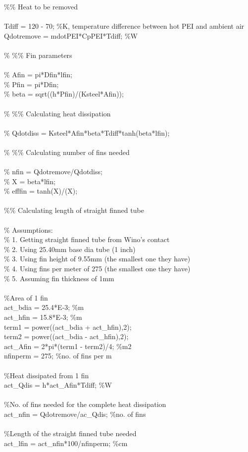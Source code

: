 \begin{appendices}
{\%\% Heat to be removed \\
\\
Tdiff = 120 - 70; \%K, temperature difference between hot PEI and ambient air \\
Qdotremove = mdotPEI*CpPEI*Tdiff; \%W \\
\\
\% \%\% Fin parameters \\
\\
\% Afin = pi*Dfin*lfin; \\
\% Pfin = pi*Dfin; \\
\% beta = sqrt((h*Pfin)/(Ksteel*Afin)); \\
\\
\% \%\% Calculating heat dissipation \\
\\
\% Qdotdiss = Ksteel*Afin*beta*Tdiff*tanh(beta*lfin); \\
\\ 
\% \%\% Calculating number of fins needed \\
\\
\% nfin = Qdotremove/Qdotdiss; \\
\% X = beta*lfin; \\
\% efffin = tanh(X)/(X); \\
\\
\%\% Calculating length of straight finned tube \\
\\
\% Assumptions: \\
\% 1. Getting straight finned tube from Wino's contact \\
\% 2. Using 25.40mm base dia tube (1 inch) \\
\% 3. Using fin height of 9.55mm (the smallest one they have) \\
\% 4. Using fins per meter of 275 (the smallest one they have) \\
\% 5. Assuming fin thickness of 1mm \\
\\ 
\%Area of 1 fin \\
act\_bdia = 25.4*E-3; \%m \\
act\_hfin = 15.8*E-3; \%m \\
term1 = power((act\_bdia + act\_hfin),2); \\
term2 = power((act\_bdia - act\_hfin),2); \\
act\_Afin = 2*pi*(term1 - term2)/4; \%m2 \\
nfinperm = 275; \%no. of fins per m \\
\\
\%Heat dissipated from 1 fin \\
act\_Qdis = h*act\_Afin*Tdiff; \%W \\
\\
\%No. of fins needed for the complete heat dissipation \\
act\_nfin = Qdotremove/ac\_Qdis; \%no. of fins \\
\\
\%Length of the straight finned tube needed \\
act\_lfin = act\_nfin*100/nfinperm; \%cm \\
}




\end{appendices}
